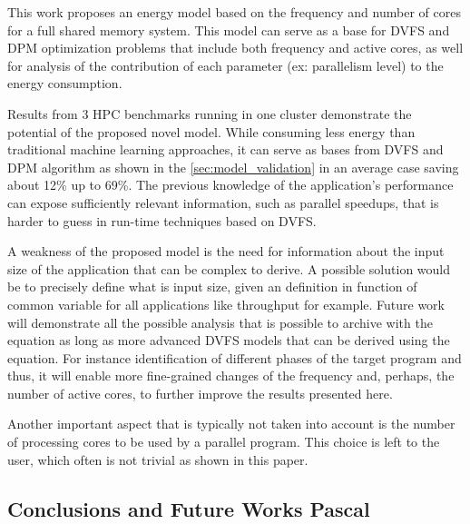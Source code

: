 

This work proposes an energy model based on the frequency and number of cores for a full shared memory system. This model can serve as a base for DVFS and DPM optimization problems that include both frequency and active cores, as well for analysis of the contribution of each parameter (ex: parallelism level) to the energy consumption.

Results from 3 HPC benchmarks running in one cluster demonstrate the potential of the proposed novel model. While consuming less energy than traditional machine learning approaches, it can serve as bases from DVFS and DPM algorithm as shown in the \ref{sec:model_validation} in an average case saving about 12\% up to 69\%. The previous knowledge of the application's performance can expose sufficiently relevant information, such as parallel speedups, that is harder to guess in run-time techniques based on DVFS.

A weakness of the proposed model is the need for information about the input size of the application that can be complex to derive. A possible solution would be to precisely define what is input size, given an definition in function of common variable for all applications like throughput for example. Future work will demonstrate all the possible analysis that is possible to archive with the equation as long as more advanced DVFS models that can be derived using the equation. For instance identification of different phases of the target program and thus, it will enable more fine-grained changes of the frequency and, perhaps, the number of active cores, to further improve the results presented here.

Another important aspect that is typically not taken into account is the number of processing cores to be used by a parallel program. This choice is left to the user, which often is not trivial as shown in this paper.


\subsection{Conclusions and Future Works Pascal} \label{sec:conclusions_pascal}

